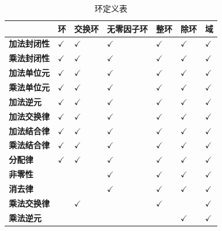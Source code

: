 \begin{table}[H]
	\centering
	\caption{环定义表}
	\begin{tabular}{|>{\centering\arraybackslash}m{2cm}|>{\centering\arraybackslash}m{2cm}|>{\centering\arraybackslash}m{2cm}|>{\centering\arraybackslash}m{2cm}|>{\centering\arraybackslash}m{2cm}|>{\centering\arraybackslash}m{2cm}|>{\centering\arraybackslash}m{2cm}|}
		\hline
		&      \textbf{环}      &    \textbf{交换环}    &  \textbf{无零因子环}  &     \textbf{整环}     &     \textbf{除环}     &      \textbf{域}      \\
		\hline
		\textbf{加法封闭性} & $\checkmark$ & $\checkmark$ & $\checkmark$ & $\checkmark$ & $\checkmark$ & $\checkmark$ \\
		\hline
		\textbf{乘法封闭性} & $\checkmark$ & $\checkmark$ & $\checkmark$ & $\checkmark$ & $\checkmark$ & $\checkmark$ \\
		\hline
		\textbf{加法单位元} & $\checkmark$ & $\checkmark$ & $\checkmark$ & $\checkmark$ & $\checkmark$ & $\checkmark$ \\
		\hline
		\textbf{乘法单位元} & $\checkmark$ & $\checkmark$ & $\checkmark$ & $\checkmark$ & $\checkmark$ & $\checkmark$ \\
		\hline
		\textbf{加法逆元}   & $\checkmark$ & $\checkmark$ & $\checkmark$ & $\checkmark$ & $\checkmark$ & $\checkmark$ \\
		\hline
		\textbf{加法交换律} & $\checkmark$ & $\checkmark$ & $\checkmark$ & $\checkmark$ & $\checkmark$ & $\checkmark$ \\
		\hline
		\textbf{加法结合律} & $\checkmark$ & $\checkmark$ & $\checkmark$ & $\checkmark$ & $\checkmark$ & $\checkmark$ \\
		\hline
		\textbf{乘法结合律} & $\checkmark$ & $\checkmark$ & $\checkmark$ & $\checkmark$ & $\checkmark$ & $\checkmark$ \\
		\hline
		\textbf{分配律}     & $\checkmark$ & $\checkmark$ & $\checkmark$ & $\checkmark$ & $\checkmark$ & $\checkmark$ \\
		\hline
		\textbf{非零性}     &              &              & $\checkmark$ & $\checkmark$ & $\checkmark$ & $\checkmark$ \\
		\hline
		\textbf{消去律}     &              &              & $\checkmark$ & $\checkmark$ & $\checkmark$ & $\checkmark$ \\
		\hline
		\textbf{乘法交换律} &              & $\checkmark$ &              & $\checkmark$ &              & $\checkmark$ \\
		\hline
		\textbf{乘法逆元}   &              &              &              &              & $\checkmark$ & $\checkmark$ \\
		\hline
	\end{tabular}
\end{table}

